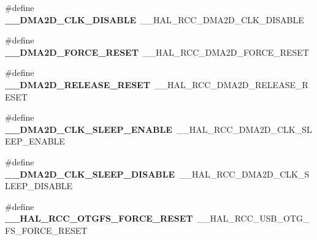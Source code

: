 \begin{DoxyCompactItemize}
\item 
\#define {\bfseries \+\_\+\+\_\+\+D\+M\+A2\+D\+\_\+\+C\+L\+K\+\_\+\+D\+I\+S\+A\+B\+LE}~\+\_\+\+\_\+\+H\+A\+L\+\_\+\+R\+C\+C\+\_\+\+D\+M\+A2\+D\+\_\+\+C\+L\+K\+\_\+\+D\+I\+S\+A\+B\+LE\hypertarget{group___h_a_l___r_c_c___aliased_gab1531390432dc2c531464eb1507dcf3f}{}\label{group___h_a_l___r_c_c___aliased_gab1531390432dc2c531464eb1507dcf3f}

\item 
\#define {\bfseries \+\_\+\+\_\+\+D\+M\+A2\+D\+\_\+\+F\+O\+R\+C\+E\+\_\+\+R\+E\+S\+ET}~\+\_\+\+\_\+\+H\+A\+L\+\_\+\+R\+C\+C\+\_\+\+D\+M\+A2\+D\+\_\+\+F\+O\+R\+C\+E\+\_\+\+R\+E\+S\+ET\hypertarget{group___h_a_l___r_c_c___aliased_ga8e258b69f763083aca55602dc6d61353}{}\label{group___h_a_l___r_c_c___aliased_ga8e258b69f763083aca55602dc6d61353}

\item 
\#define {\bfseries \+\_\+\+\_\+\+D\+M\+A2\+D\+\_\+\+R\+E\+L\+E\+A\+S\+E\+\_\+\+R\+E\+S\+ET}~\+\_\+\+\_\+\+H\+A\+L\+\_\+\+R\+C\+C\+\_\+\+D\+M\+A2\+D\+\_\+\+R\+E\+L\+E\+A\+S\+E\+\_\+\+R\+E\+S\+ET\hypertarget{group___h_a_l___r_c_c___aliased_ga90c57750464803782f28e36f4949995e}{}\label{group___h_a_l___r_c_c___aliased_ga90c57750464803782f28e36f4949995e}

\item 
\#define {\bfseries \+\_\+\+\_\+\+D\+M\+A2\+D\+\_\+\+C\+L\+K\+\_\+\+S\+L\+E\+E\+P\+\_\+\+E\+N\+A\+B\+LE}~\+\_\+\+\_\+\+H\+A\+L\+\_\+\+R\+C\+C\+\_\+\+D\+M\+A2\+D\+\_\+\+C\+L\+K\+\_\+\+S\+L\+E\+E\+P\+\_\+\+E\+N\+A\+B\+LE\hypertarget{group___h_a_l___r_c_c___aliased_gadaa25978a7572300aeac9a3d6d57d8ce}{}\label{group___h_a_l___r_c_c___aliased_gadaa25978a7572300aeac9a3d6d57d8ce}

\item 
\#define {\bfseries \+\_\+\+\_\+\+D\+M\+A2\+D\+\_\+\+C\+L\+K\+\_\+\+S\+L\+E\+E\+P\+\_\+\+D\+I\+S\+A\+B\+LE}~\+\_\+\+\_\+\+H\+A\+L\+\_\+\+R\+C\+C\+\_\+\+D\+M\+A2\+D\+\_\+\+C\+L\+K\+\_\+\+S\+L\+E\+E\+P\+\_\+\+D\+I\+S\+A\+B\+LE\hypertarget{group___h_a_l___r_c_c___aliased_ga110cab59300981de86087cbc6469fc22}{}\label{group___h_a_l___r_c_c___aliased_ga110cab59300981de86087cbc6469fc22}

\item 
\#define {\bfseries \+\_\+\+\_\+\+H\+A\+L\+\_\+\+R\+C\+C\+\_\+\+O\+T\+G\+F\+S\+\_\+\+F\+O\+R\+C\+E\+\_\+\+R\+E\+S\+ET}~\+\_\+\+\_\+\+H\+A\+L\+\_\+\+R\+C\+C\+\_\+\+U\+S\+B\+\_\+\+O\+T\+G\+\_\+\+F\+S\+\_\+\+F\+O\+R\+C\+E\+\_\+\+R\+E\+S\+ET\hypertarget{group___h_a_l___r_c_c___aliased_gabc6844528b432554fefc7643de9a9dd9}{}\label{group___h_a_l___r_c_c___aliased_gabc6844528b432554fefc7643de9a9dd9}


\end{DoxyCompactItemize}
